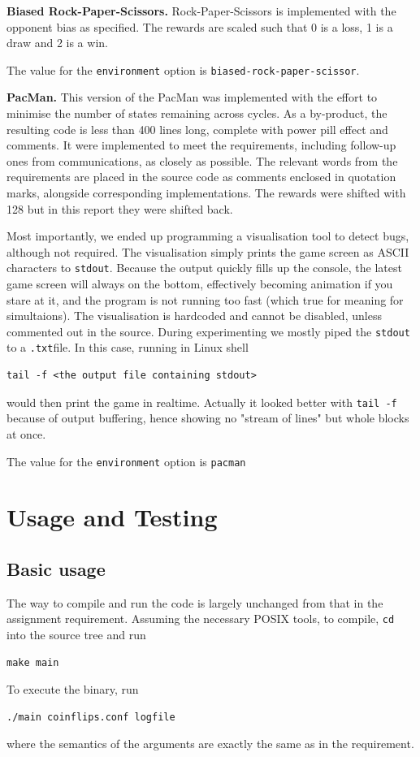 \documentclass{article}
\let\Oldsection\section
\renewcommand{\section}{\FloatBarrier\Oldsection}
\let\Oldsubsection\subsection
\renewcommand{\subsection}{\FloatBarrier\Oldsubsection}
\begin{document}
\begin{flushleft}
\textbf{Biased Rock-Paper-Scissors. } Rock-Paper-Scissors is implemented with the opponent bias as specified. The rewards are scaled such that 0 is a loss, 1 is a draw and 2 is a win. 

The value for the \verb|environment| option is \verb|biased-rock-paper-scissor|.
\newline

\textbf{PacMan. } 
This version of the PacMan was implemented with the 
effort to minimise the number of states remaining across cycles.
As a by-product, the resulting code is less than 400 lines long,
complete with power pill effect and comments.
It were implemented to meet the requirements, including follow-up
ones from communications, as closely as possible.
The relevant words from the requirements are placed 
in the source code as comments enclosed in quotation marks,
alongside corresponding implementations.
The rewards were shifted with 128 but in this report they
were shifted back.

Most importantly, we ended up programming a visualisation tool 
to detect bugs, although not required.
The visualisation simply prints the game screen as 
ASCII characters to \verb|stdout|. Because the output
quickly fills up the console, the latest game screen
will always on the bottom, effectively becoming animation
if you stare at it, and the program is not running too
fast (which true for meaning for simultaions).
The visualisation is hardcoded and cannot be disabled,
unless commented out in the source.
During experimenting we mostly piped the \verb|stdout|
to a \verb|.txt|file. In this case,
running in Linux shell
\begin{verbatim}
tail -f <the output file containing stdout>
\end{verbatim}
would then print the game in realtime.
Actually it looked better with \verb|tail -f|
because of output buffering, hence showing no "stream
of lines" but whole blocks at once.


The value for the \verb|environment| option is \verb|pacman|
\newline

\section{Usage and Testing}

\subsection{Basic usage}
The way to compile and run the code is largely unchanged from that in the assignment requirement.
Assuming the necessary POSIX tools, to compile, \verb|cd| into the source tree and 
run 
\begin{verbatim}
make main
\end{verbatim}
To execute the binary, run
\begin{verbatim}
./main coinflips.conf logfile
\end{verbatim}
where the semantics of the arguments are exactly the same as in the requirement.



\end{flushleft}
\end{document}
